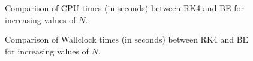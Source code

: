 \documentclass{article}
\begin{document}
\begin{figure}[ht]
\caption{Comparison of CPU times (in seconds) between RK4 and BE for increasing values of $N$.}
\label{fig:compare-cpu-times}
\end{figure}

\begin{figure}[ht]
\caption{Comparison of Wallclock times (in seconds) between RK4 and BE for increasing values of $N$.}
\label{fig:compare-wall-times}
\end{figure}
\end{document}
